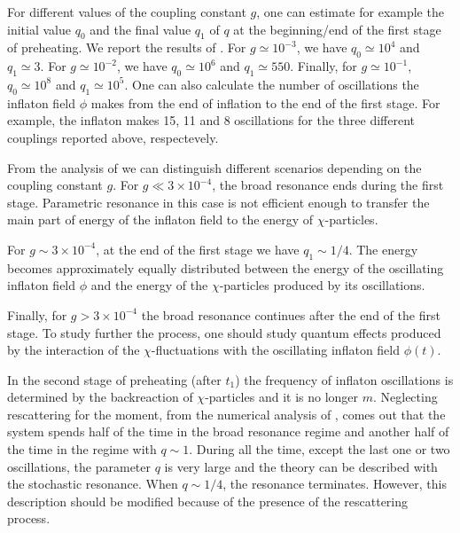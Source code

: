 \documentclass[11pt,a4paper,twoside]{book}
\begin{document}
 For different values of the coupling constant $ g $, one can estimate for example the initial value $ q_{0} $ and the final value $ q_{1} $ of $ q $ at the  beginning/end of the first stage of preheating. We report the results of \cite{Chap4:LindePreheatingModel}. For $ g \simeq 10^{-3}$, we have $q_{0}\simeq 10^{4} $ and $ q_{1}\simeq 3 $. For $ g \simeq 10^{-2} $, we have $q_{0} \simeq 10^{6} $ and $ q_{1}\simeq 550 $. Finally, for $g\simeq 10^{-1} $, $ q_{0}\simeq 10^{8} $ and $ q_{1} \simeq 10^{5} $. One can also calculate the number of oscillations the inflaton field $ \phi $ makes from the end of inflation to the end of the first stage. For example, the inflaton makes 15, 11 and 8 oscillations for the three different couplings reported above, respectevely.
 
 From the analysis of \cite{Chap4:LindePreheatingModel} we can distinguish different scenarios depending on the coupling constant $ g $. For $ g \ll 3 \times 10^{-4} $, the broad resonance ends during the first stage. Parametric resonance in this case is not efficient enough to transfer the main part of energy of the inflaton field to the energy of  $\chi$-particles. 
 
 For $ g\sim 3 \times 10^{-4} $, at the end of the first stage we have $ q_{1} \sim 1/4 $. The energy becomes approximately equally distributed between the energy of the oscillating inflaton field $\phi$ and the energy of the $\chi$-particles produced by its oscillations.
 
 Finally, for $ g > 3 \times 10^{-4} $ the broad resonance continues after  the end of the first stage.  To study further the process, one should study quantum effects produced by the interaction of the $ \chi $-fluctuations with the oscillating inflaton field $\phi(t)$.
 
 In the second stage of preheating (after $ t_{1} $) the frequency  of inflaton oscillations is determined by the backreaction of $ \chi $-particles and it is no longer $ m $.
 Neglecting rescattering for the moment, from the numerical analysis of \cite{Chap4:LindePreheatingModel}, comes out that the system  spends half of the time in the broad resonance regime and another half of the time in the regime with $ q \sim 1 $. During all the time, except the last one or two oscillations, the parameter $ q $ is very large and the theory can be described with the stochastic resonance. When $ q\sim 1/4 $, the resonance terminates. However, this description should be modified because of the presence of the rescattering process. 
 
\end{document}
